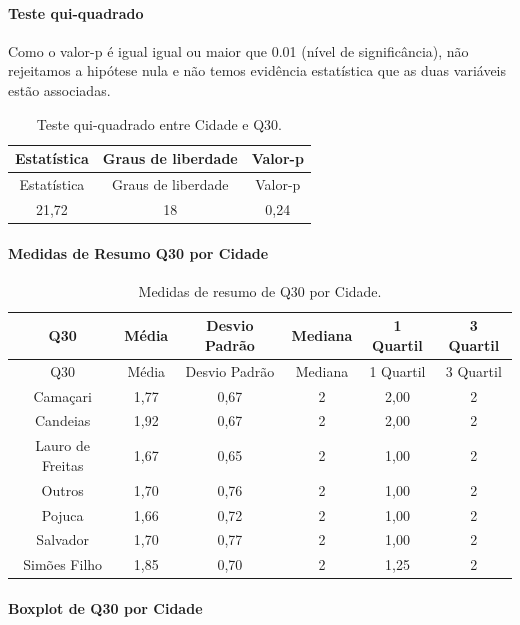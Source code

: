 \documentclass[]{article}
\let\oldparagraph\paragraph
\renewcommand{\paragraph}[1]{\oldparagraph{#1}\mbox{}}
\begin{document}
\hypertarget{teste-qui-quadrado-82}{%
\paragraph{Teste qui-quadrado}\label{teste-qui-quadrado-82}}

Como o valor-p é igual igual ou maior que 0.01 (nível de significância), não rejeitamos a hipótese nula e não temos evidência estatística que as duas variáveis estão associadas.

\begin{longtable}[]{@{}ccc@{}}
\caption{\label{tab:unnamed-chunk-959}Teste qui-quadrado entre Cidade e Q30.}\tabularnewline
\toprule
Estatística & Graus de liberdade & Valor-p\tabularnewline
\midrule
\endfirsthead
\toprule
Estatística & Graus de liberdade & Valor-p\tabularnewline
\midrule
\endhead
21,72 & 18 & 0,24\tabularnewline
\bottomrule
\end{longtable}

\cleardoublepage

\hypertarget{medidas-de-resumo-q30-por-cidade}{%
\paragraph{Medidas de Resumo Q30 por Cidade}\label{medidas-de-resumo-q30-por-cidade}}

\begin{longtable}[]{@{}cccccc@{}}
\caption{\label{tab:unnamed-chunk-960}Medidas de resumo de Q30 por Cidade.}\tabularnewline
\toprule
Q30 & Média & Desvio Padrão & Mediana & 1 Quartil & 3 Quartil\tabularnewline
\midrule
\endfirsthead
\toprule
Q30 & Média & Desvio Padrão & Mediana & 1 Quartil & 3 Quartil\tabularnewline
\midrule
\endhead
Camaçari & 1,77 & 0,67 & 2 & 2,00 & 2\tabularnewline
Candeias & 1,92 & 0,67 & 2 & 2,00 & 2\tabularnewline
Lauro de Freitas & 1,67 & 0,65 & 2 & 1,00 & 2\tabularnewline
Outros & 1,70 & 0,76 & 2 & 1,00 & 2\tabularnewline
Pojuca & 1,66 & 0,72 & 2 & 1,00 & 2\tabularnewline
Salvador & 1,70 & 0,77 & 2 & 1,00 & 2\tabularnewline
Simões Filho & 1,85 & 0,70 & 2 & 1,25 & 2\tabularnewline
\bottomrule
\end{longtable}

\hypertarget{boxplot-de-q30-por-cidade}{%
\paragraph{Boxplot de Q30 por Cidade}\label{boxplot-de-q30-por-cidade}}
\end{document}

